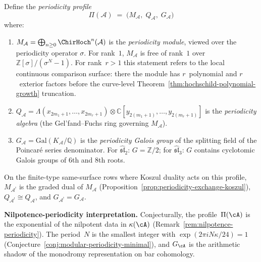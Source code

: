\begin{remark}\label{rem:periodicity-triple}
Define the \emph{periodicity profile}
\[
\Pi(\mathcal{A}) \;=\; \bigl(M_{\mathcal{A}},\; Q_{\mathcal{A}},\;
G_{\mathcal{A}}\bigr)
\]
where:
\begin{enumerate}[label=\textup{(\roman*)}]
\item $M_{\mathcal{A}} = \bigoplus_{n \geq 0} \ChirHoch^n(\mathcal{A})$ is the \emph{periodicity module}, viewed over the periodicity operator $\sigma$. For rank~$1$, $M_{\mathcal{A}}$ is free of rank~$1$ over $\mathbb{Z}[\sigma]/(\sigma^N - 1)$. For rank~$r > 1$ this statement refers to the local continuous comparison surface: there the module has $r$~polynomial and $r$~exterior factors before the curve-level Theorem~\ref{thm:hochschild-polynomial-growth} truncation.
\item $Q_{\mathcal{A}} = \Lambda(x_{2m_1+1}, \ldots, x_{2m_r+1}) \otimes \mathbb{C}[y_{2(m_1+1)}, \ldots, y_{2(m_r+1)}]$ is the \emph{periodicity algebra} (the Gel'fand--Fuchs ring governing $M_{\mathcal{A}}$).
\item $G_{\mathcal{A}} = \mathrm{Gal}(K_{\mathcal{A}}/\mathbb{Q})$ is the \emph{periodicity Galois group} of the splitting field of the Poincar\'e series denominator. For $\widehat{\mathfrak{sl}}_2$: $G = \mathbb{Z}/2$; for $\widehat{\mathfrak{sl}}_3$: $G$ contains cyclotomic Galois groups of $6$th and $8$th roots.
\end{enumerate}
On the finite-type same-surface rows where Koszul duality acts on
this profile, $M_{\mathcal{A}^!}$ is the graded dual of
$M_{\mathcal{A}}$ (Proposition~\ref{prop:periodicity-exchange-koszul}),
$Q_{\mathcal{A}^!} \cong Q_{\mathcal{A}}$, and
$G_{\mathcal{A}^!} = G_{\mathcal{A}}$.

\textbf{Nilpotence-periodicity interpretation.}
Conjecturally, the profile~$\Pi(\cA)$ is the exponential of the
nilpotent data in $\kappa(\cA)$
(Remark~\ref{rem:nilpotence-periodicity}). The period~$N$ is the
smallest integer with $\exp(2\pi i N \kappa/24) = 1$
(Conjecture~\ref{conj:modular-periodicity-minimal}), and $G_{\cA}$
is the arithmetic shadow of the monodromy representation on bar
cohomology.
\end{remark}

